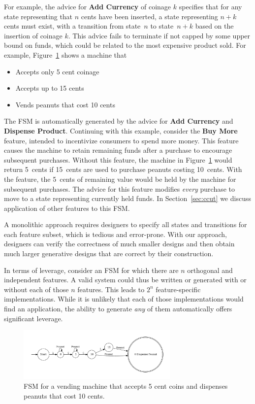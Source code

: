 \documentclass[sigplan,anonymous,review]{acmart}
\begin{document}
For example, the advice for \textbf{Add Currency} of coinage $k$ specifies that for any state representing that $n$ cents have been inserted, a state representing $n+k$ cents must exist, with a transition from state~$n$ to state~$n+k$ based on the insertion of coinage $k$.   This advice fails to terminate if not capped by some upper bound on funds, which could be related to the most expensive product sold. For example, Figure~\ref{fig:vend1} shows a machine that
\begin{itemize}
    \item Accepts only 5 cent coinage
    \item Accepts up to 15 cents
    \item Vends peanuts that cost 10 cents
\end{itemize}
The FSM is automatically generated by the advice for \textbf{Add Currency} and \textbf{Dispense Product}.  Continuing with this example, consider the \textbf{Buy More} feature, intended to incentivize consumers to spend more money.  This feature causes the machine to retain remaining funds after a purchase to encourage subsequent purchases.  Without this feature, the machine in Figure~\ref{fig:vend1} would return 5~cents if 15~cents are used to purchase peanuts costing 10~cents.  With the feature, the 5~cents of remaining value would be held by the machine for subsequent purchases.  The advice for this feature modifies \emph{every} purchase to move to a state representing currently held funds.  In Section~\ref{sec:ccut} we discuss application of other features to this FSM.

A monolithic approach requires designers to specify all states and transitions for each feature subset, which is tedious and error-prone. With our approach, designers can verify the correctness of much smaller designs and then obtain much larger generative designs that are correct by their construction.

In terms of leverage, consider an FSM for which there are $n$ orthogonal and independent features.  A valid system could thus be written or generated with or without each of those $n$ features.  This leads to $2^{n}$ feature-specific implementations.  While it is unlikely that each of those implementations would find an application, the ability to generate \emph{any} of them automatically offers significant leverage.

\begin{figure}
    \centering
    \includegraphics[width=0.7\textwidth]{figures/vend1.pdf}
    \caption{FSM for a vending machine that accepts 5 cent coins and dispenses peanuts that cost 10 cents.}
    \label{fig:vend1}
\end{figure}
\end{document}
